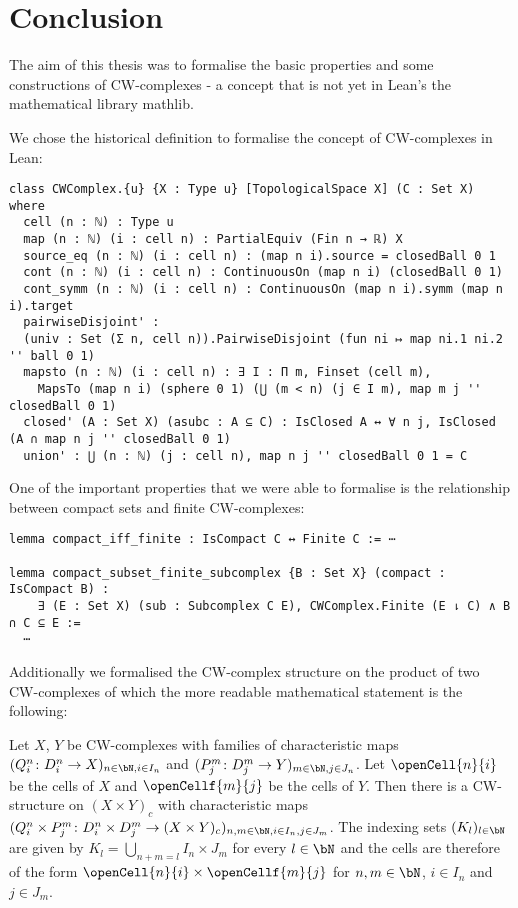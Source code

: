 \chapter*{Conclusion}

The aim of this thesis was to formalise the basic properties and some constructions of CW-complexes - a concept that is not yet in Lean's the mathematical library mathlib. 

We chose the historical definition to formalise the concept of CW-complexes in Lean: 

\begin{lstlisting}
class CWComplex.{u} {X : Type u} [TopologicalSpace X] (C : Set X) where
  cell (n : ℕ) : Type u
  map (n : ℕ) (i : cell n) : PartialEquiv (Fin n → ℝ) X
  source_eq (n : ℕ) (i : cell n) : (map n i).source = closedBall 0 1
  cont (n : ℕ) (i : cell n) : ContinuousOn (map n i) (closedBall 0 1)
  cont_symm (n : ℕ) (i : cell n) : ContinuousOn (map n i).symm (map n i).target
  pairwiseDisjoint' :
  (univ : Set (Σ n, cell n)).PairwiseDisjoint (fun ni ↦ map ni.1 ni.2 '' ball 0 1)
  mapsto (n : ℕ) (i : cell n) : ∃ I : Π m, Finset (cell m),
    MapsTo (map n i) (sphere 0 1) (⋃ (m < n) (j ∈ I m), map m j '' closedBall 0 1)
  closed' (A : Set X) (asubc : A ⊆ C) : IsClosed A ↔ ∀ n j, IsClosed (A ∩ map n j '' closedBall 0 1)
  union' : ⋃ (n : ℕ) (j : cell n), map n j '' closedBall 0 1 = C
\end{lstlisting}

One of the important properties that we were able to formalise is the relationship between compact sets and finite CW-complexes: 

\begin{lstlisting}
lemma compact_iff_finite : IsCompact C ↔ Finite C := ⋯

lemma compact_subset_finite_subcomplex {B : Set X} (compact : IsCompact B) :
    ∃ (E : Set X) (sub : Subcomplex C E), CWComplex.Finite (E ⇂ C) ∧ B ∩ C ⊆ E := 
  ⋯
\end{lstlisting}

Additionally we formalised the CW-complex structure on the product of two CW-complexes of which the more readable mathematical statement is the following: 

\begin{thm*}
    Let $X$, $Y$ be CW-complexes with families of characteristic maps $(Q_i^n \colon D_i^n \to X)_{n \in \bN, i \in I_n}$ and $(P_j^m \colon D_j^m \to Y)_{m \in \bN, j \in J_n}$. 
    Let $\openCell{n}{i}$ be the cells of $X$ and $\openCellf{m}{j}$ be the cells of $Y$.
    Then there is a CW-structure on $(X \times Y)_c$ with characteristic maps $(Q_i^n \times P_j^m \colon D_i^n \times D_j^m \to (X \times Y)_c)_{n,m \in \bN,i \in I_n,j \in J_m}$.
    The indexing sets $(K_l)_{l \in \bN}$ are given by $K_l = \bigcup_{n + m = l}I_n \times J_m$ for every $l \in \bN$ and the cells are therefore of the form $\openCell{n}{i} \times \openCellf{m}{j}$ for $n, m \in \bN$, $i \in I_n$ and $j \in J_m$.
\end{thm*}


